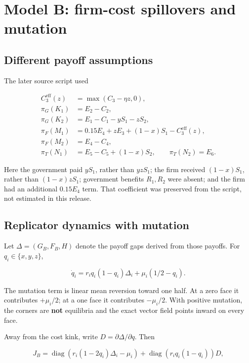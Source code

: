 \documentclass[
  11pt,
  letterpaper,
]{article}
\begin{document}
\section{Model B: firm-cost spillovers and
mutation}\label{model-b-firm-cost-spillovers-and-mutation}

\subsection{Different payoff
assumptions}\label{different-payoff-assumptions}

The later source script used

\[
\begin{aligned}
C_3^{\mathrm{eff}}(z)&=\max(C_3-\eta z,0),\\
\pi_G(K_1)&=E_2-C_2,\\
\pi_G(K_2)&=E_1-C_1-yS_1-zS_2,\\
\pi_F(M_1)&=0.15E_4+zE_3+(1-x)S_1-C_3^{\mathrm{eff}}(z),\\
\pi_F(M_2)&=E_4-C_4,\\
\pi_T(N_1)&=E_5-C_5+(1-x)S_2,\qquad \pi_T(N_2)=E_6.
\end{aligned}
\]

Here the government paid \(yS_1\), rather than \(yzS_1\); the firm
received \((1-x)S_1\), rather than \((1-x)zS_1\); government benefits
\(R_1,R_2\) were absent; and the firm had an additional \(0.15E_4\)
term. That coefficient was preserved from the script, not estimated in
this release.

\subsection{Replicator dynamics with
mutation}\label{replicator-dynamics-with-mutation}

Let \(\Delta=(G_B,F_B,H)\) denote the payoff gaps derived from those
payoffs. For \(q_i\in\{x,y,z\}\),

\[\dot q_i=r_iq_i(1-q_i)\Delta_i+\mu_i(1/2-q_i).\]

The mutation term is linear mean reversion toward one half. At a zero
face it contributes \(+\mu_i/2\); at a one face it contributes
\(-\mu_i/2\). With positive mutation, the corners are \textbf{not}
equilibria and the exact vector field points inward on every face.

Away from the cost kink, write \(D=\partial\Delta/\partial q\). Then

\[
J_B=\operatorname{diag}(r_i(1-2q_i)\Delta_i-\mu_i)
+\operatorname{diag}(r_iq_i(1-q_i))D,
\]
\end{document}
